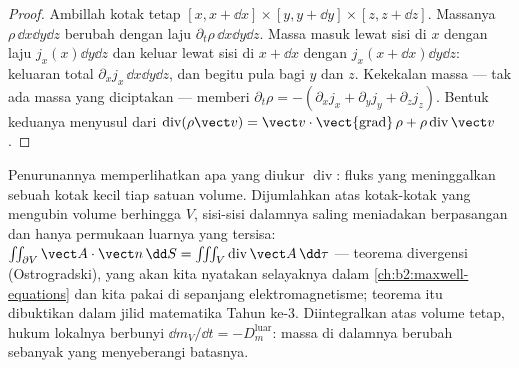 \begin{proof}
Ambillah kotak tetap $[x, x + \dd x]\times[y, y + \dd y]\times[z, z + \dd z]$.
Massanya $\rho\,\dd x\dd y\dd z$ berubah dengan laju $\partial_t\rho\,\dd x\dd y
\dd z$. Massa masuk lewat sisi di $x$ dengan laju $j_x(x)\dd y\dd z$
dan keluar lewat sisi di $x + \dd x$ dengan $j_x(x + \dd x)\dd y\dd z$:
keluaran total $\partial_xj_x\,\dd x\dd y\dd z$, dan begitu pula bagi $y$ dan $z$.
Kekekalan massa --- tak ada massa yang diciptakan --- memberi $\partial_t\rho = -
(\partial_xj_x + \partial_yj_y + \partial_zj_z)$. Bentuk keduanya menyusul dari
$\operatorname{div}(\rho\vect v) = \vect v\cdot\operatorname{\vect{grad}}\rho +
\rho\operatorname{div}\vect v$.
\end{proof}

\begin{remark}\label{rem:b2:fluid-kinematics:divergence}
Penurunannya memperlihatkan apa yang diukur $\operatorname{div}$: fluks
yang meninggalkan sebuah kotak kecil tiap satuan volume. Dijumlahkan
atas kotak-kotak yang mengubin volume berhingga $V$, sisi-sisi dalamnya
saling meniadakan berpasangan dan hanya permukaan luarnya yang tersisa:
$\iint_{\partial V}\vect A\cdot\vect n\,\dd S = \iiint_V
\operatorname{div}\vect A\,\dd\tau$ --- teorema divergensi
(Ostrogradski), yang akan kita nyatakan selayaknya dalam
\cref{ch:b2:maxwell-equations} dan kita pakai di sepanjang
elektromagnetisme; teorema itu dibuktikan dalam jilid matematika Tahun
ke-3. Diintegralkan atas volume tetap, hukum lokalnya berbunyi
$\dd m_V/\dd t = -D_m^{\text{luar}}$: massa di dalamnya berubah sebanyak
yang menyeberangi batasnya.
\end{remark}


